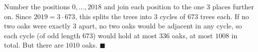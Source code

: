 Number the positions $0,\dots,2018$ and join each position to the one $3$ places further on. Since $2019=3\cdot673$, this splits the trees into $3$ cycles of $673$ trees each. If no two oaks were exactly $3$ apart, no two oaks would be adjacent in any cycle, so each cycle (of odd length $673$) would hold at most $336$ oaks, at most $1008$ in total. But there are $1010$ oaks. $\blacksquare$
